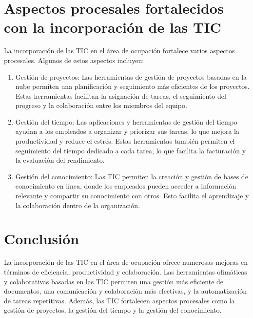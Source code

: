 \documentclass{article}
\theoremstyle{mytheoremstyle}
\theoremstyle{mytheoremstyle}
\theoremstyle{myproblemstyle}
\begin{document}
\section{Aspectos procesales fortalecidos con la incorporación de las TIC}

La incorporación de las TIC en el área de ocupación fortalece varios aspectos procesales. Algunos de estos aspectos incluyen:

\begin{enumerate}
  \item Gestión de proyectos: Las herramientas de gestión de proyectos basadas en la nube permiten una planificación y seguimiento más eficientes de los proyectos. Estas herramientas facilitan la asignación de tareas, el seguimiento del progreso y la colaboración entre los miembros del equipo.
  
  \item Gestión del tiempo: Las aplicaciones y herramientas de gestión del tiempo ayudan a los empleados a organizar y priorizar sus tareas, lo que mejora la productividad y reduce el estrés. Estas herramientas también permiten el seguimiento del tiempo dedicado a cada tarea, lo que facilita la facturación y la evaluación del rendimiento.
  
  \item Gestión del conocimiento: Las TIC permiten la creación y gestión de bases de conocimiento en línea, donde los empleados pueden acceder a información relevante y compartir su conocimiento con otros. Esto facilita el aprendizaje y la colaboración dentro de la organización.
\end{enumerate}


\newpage

\section{Conclusión}

La incorporación de las TIC en el área de ocupación ofrece numerosas mejoras en términos de eficiencia, productividad y colaboración. Las herramientas ofimáticas y colaborativas basadas en las TIC permiten una gestión más eficiente de documentos, una comunicación y colaboración más efectivas, y la automatización de tareas repetitivas. Además, las TIC fortalecen aspectos procesales como la gestión de proyectos, la gestión del tiempo y la gestión del conocimiento. 
\end{document}
